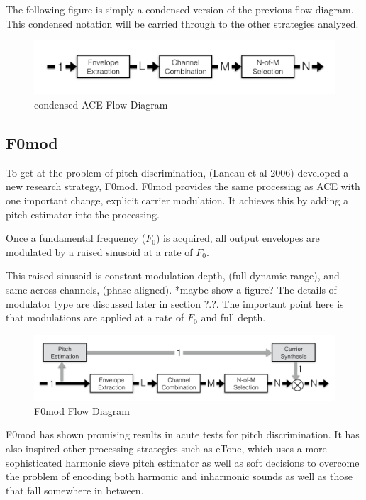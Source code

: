 \documentclass [11pt, proquest] {uwthesis}[2015/03/03]
\begin{document}
The following figure is simply a condensed version of the previous flow diagram.  This condensed notation will be carried through to the other strategies analyzed.

\begin{figure}[!ht]
  \centering
    \includegraphics[width=1\textwidth]{ACE_flow_diagramTEMP}   
    \caption{condensed ACE Flow Diagram}
\end{figure}

\subsection{F0mod}

To get at the problem of pitch discrimination, (Laneau et al 2006) developed a new research strategy, F0mod.  F0mod provides the same processing as ACE with one important change, explicit carrier modulation.  It achieves this by adding a pitch estimator into the processing.

Once a fundamental frequency ($F_0$) is acquired, all output envelopes are modulated by a raised sinusoid at a rate of $F_0$.  

This raised sinusoid is constant modulation depth, (full dynamic range), and same across channels, (phase aligned).  *maybe show a figure?  The details of modulator type are discussed later in section ?.?.  The important point here is that modulations are applied at a rate of $F_0$ and full depth.

\begin{figure}[!ht]
  \centering
    \includegraphics[width=1\textwidth]{F0mod_flow_diagramTEMP}   
    \caption{F0mod Flow Diagram}
\end{figure}

F0mod has shown promising results in acute tests for pitch discrimination.  It has also inspired other processing strategies such as eTone, which uses a more sophisticated harmonic sieve pitch estimator as well as soft decisions to overcome the problem of encoding both harmonic and inharmonic sounds as well as those that fall somewhere in between.
\end{document}
